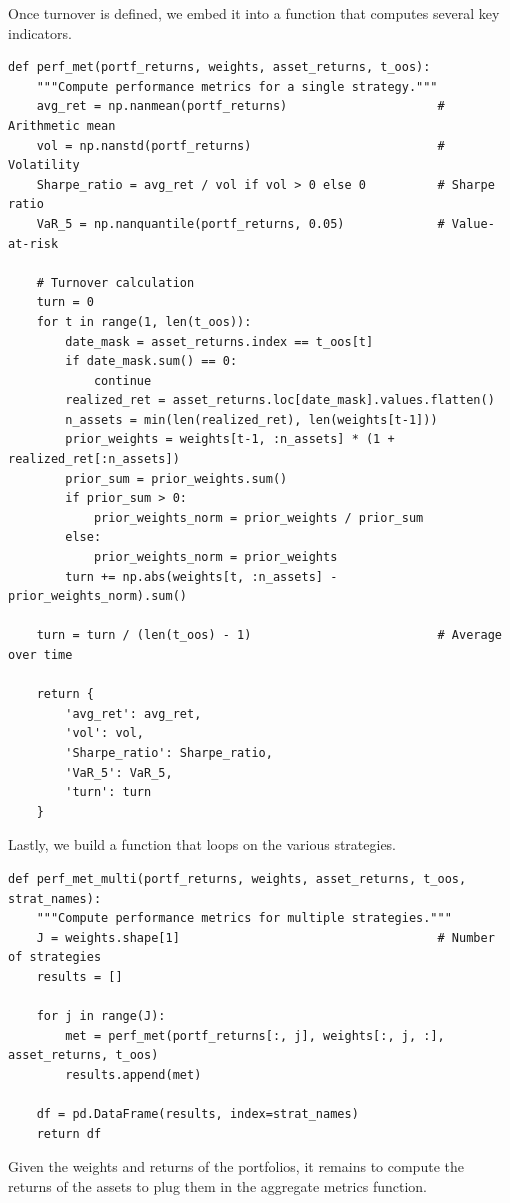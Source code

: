 Once turnover is defined, we embed it into a function that computes several key indicators.

\begin{verbatim}
def perf_met(portf_returns, weights, asset_returns, t_oos):
    """Compute performance metrics for a single strategy."""
    avg_ret = np.nanmean(portf_returns)                     # Arithmetic mean
    vol = np.nanstd(portf_returns)                          # Volatility
    Sharpe_ratio = avg_ret / vol if vol > 0 else 0          # Sharpe ratio
    VaR_5 = np.nanquantile(portf_returns, 0.05)             # Value-at-risk
    
    # Turnover calculation
    turn = 0
    for t in range(1, len(t_oos)):
        date_mask = asset_returns.index == t_oos[t]
        if date_mask.sum() == 0:
            continue
        realized_ret = asset_returns.loc[date_mask].values.flatten()
        n_assets = min(len(realized_ret), len(weights[t-1]))
        prior_weights = weights[t-1, :n_assets] * (1 + realized_ret[:n_assets])
        prior_sum = prior_weights.sum()
        if prior_sum > 0:
            prior_weights_norm = prior_weights / prior_sum
        else:
            prior_weights_norm = prior_weights
        turn += np.abs(weights[t, :n_assets] - prior_weights_norm).sum()
    
    turn = turn / (len(t_oos) - 1)                          # Average over time
    
    return {
        'avg_ret': avg_ret,
        'vol': vol,
        'Sharpe_ratio': Sharpe_ratio,
        'VaR_5': VaR_5,
        'turn': turn
    }
\end{verbatim}

Lastly, we build a function that loops on the various strategies.

\begin{verbatim}
def perf_met_multi(portf_returns, weights, asset_returns, t_oos, strat_names):
    """Compute performance metrics for multiple strategies."""
    J = weights.shape[1]                                    # Number of strategies
    results = []
    
    for j in range(J):
        met = perf_met(portf_returns[:, j], weights[:, j, :], asset_returns, t_oos)
        results.append(met)
    
    df = pd.DataFrame(results, index=strat_names)
    return df
\end{verbatim}

Given the weights and returns of the portfolios, it remains to compute the returns of the assets to plug them in the aggregate metrics function.

